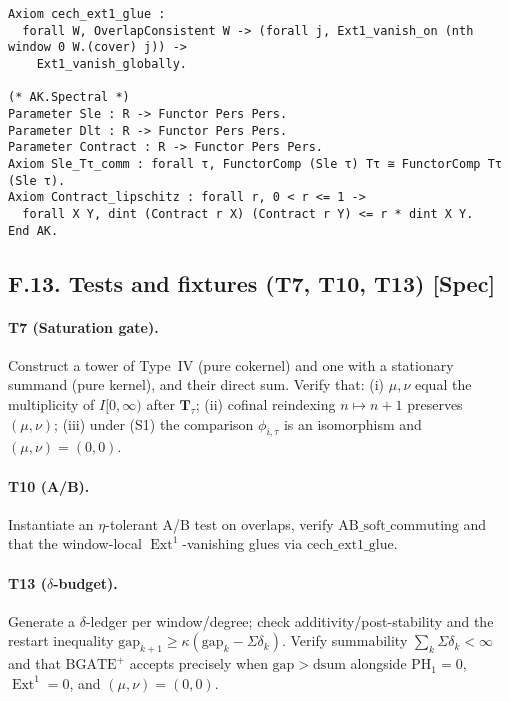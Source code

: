 \documentclass[11pt]{article}
\numberwithin{equation}{section}
\theoremstyle{plain}
\theoremstyle{definition}
\theoremstyle{remark}
\DeclareMathOperator{\Ext}{Ext}
\theoremstyle{plain}
\theoremstyle{definition}
\numberwithin{equation}{section}
\theoremstyle{definition}
\numberwithin{equation}{section}
\theoremstyle{plain}
\theoremstyle{definition}
\theoremstyle{remark}
\begin{document}
\begin{verbatim}
Axiom cech_ext1_glue :
  forall W, OverlapConsistent W -> (forall j, Ext1_vanish_on (nth window 0 W.(cover) j)) ->
    Ext1_vanish_globally.

(* AK.Spectral *)
Parameter Sle : R -> Functor Pers Pers.
Parameter Dlt : R -> Functor Pers Pers.
Parameter Contract : R -> Functor Pers Pers.
Axiom Sle_Tτ_comm : forall τ, FunctorComp (Sle τ) Tτ ≅ FunctorComp Tτ (Sle τ).
Axiom Contract_lipschitz : forall r, 0 < r <= 1 ->
  forall X Y, dint (Contract r X) (Contract r Y) <= r * dint X Y.
End AK.
\end{verbatim}

\subsection*{F.13. Tests and fixtures (T7, T10, T13) [Spec]}

\paragraph{T7 (Saturation gate).}
Construct a tower of Type~IV (pure cokernel) and one with a stationary summand (pure kernel),
and their direct sum. Verify that:
(i) \(\mu,\nu\) equal the multiplicity of \(I[0,\infty)\) after \(\mathbf{T}_\tau\);
(ii) cofinal reindexing \(n\mapsto n+1\) preserves \((\mu,\nu)\);
(iii) under (S1) the comparison \(\phi_{i,\tau}\) is an isomorphism and \((\mu,\nu)=(0,0)\).

\paragraph{T10 (A/B).}
Instantiate an \(\eta\)-tolerant A/B test on overlaps, verify \(\mathrm{AB\_soft\_commuting}\) and that the
window-local \(\Ext^1\)-vanishing glues via \(\mathrm{cech\_ext1\_glue}\).

\paragraph{T13 (\(\delta\)-budget).}
Generate a \(\delta\)-ledger per window/degree; check additivity/post-stability and the restart inequality
\(\mathrm{gap}_{k+1}\ge \kappa(\mathrm{gap}_k-\Sigma\delta_k)\).
Verify summability \(\sum_k\Sigma\delta_k<\infty\) and that \(\mathrm{BGATE}^+\) accepts precisely when
\(\mathrm{gap}>\mathrm{dsum}\) alongside \(\mathrm{PH}_1=0\), \(\Ext^1=0\), and \((\mu,\nu)=(0,0)\).

\end{document}
